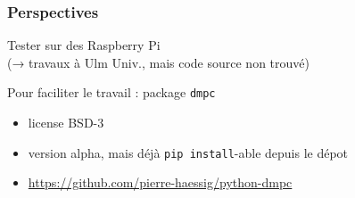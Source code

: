 \begin{frame}[c]
  \frametitle{Perspectives}
  
  Tester sur des Raspberry Pi\\ (→ travaux à Ulm Univ., mais code source non trouvé)
  

  \bigskip
  
  Pour faciliter le travail :
  package \texttt{dmpc} 
  
  \begin{itemize}
   \item license BSD-3
   \item version alpha, mais déjà \texttt{pip install}-able depuis le dépot
   \item \url{https://github.com/pierre-haessig/python-dmpc}
  \end{itemize}
  
\end{frame}




